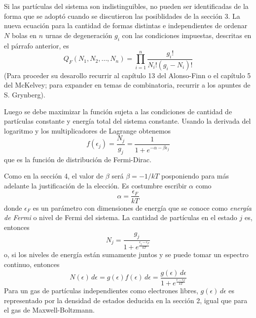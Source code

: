 \documentclass[12pt,a4paper]{article}
\def\e{{\epsilon}} %
\begin{document}
Si las partículas del sistema son indistinguibles, no pueden ser identificadas de la forma que se adoptó cuando se discutieron las posiblidades de la sección 3. La nueva ecuación para la cantidad de formas distintas e independientes de ordenar $N$ bolas en $n$ urnas de degeneración $g_{i}$ con las condiciones impuestas, descritas en el párrafo anterior, es
\[ Q_{F}(N_{1},N_{2}, \ldots, N_{n})=\prod _{i=1}^{n} \frac{g_{i}!}{N_{i}!(g_{i}-N_{i})!} \]
(Para proceder su desarollo recurrir al capítulo 13 del Alonso-Finn o el capítulo 5 del McKelvey; para expander en temas de combinatoria, recurrir a los apuntes de S. Grynberg).

Luego se debe maximizar la función sujeta a las condiciones de cantidad de partículas constante y energía total del sistema constante. Usando la derivada del logaritmo y los multiplicadores de Lagrange obtenemos
\[ f(\e_{j})=\frac{N_{j}}{g_{j}}=\frac{1}{1+e^{-\alpha-\beta \e_{j}}} \]
que es la función de distribución de Fermi-Dirac.

Como en la sección 4, el valor de $\beta$ será $\beta=-1/kT$ posponiendo para más adelante la justificación de la elección. Es costumbre escribir $\alpha$ como
\[ \alpha=\frac{\e_{F}}{kT} \]
donde $\e_{F}$ es un parámetro con dimensiones de energía que se conoce como \emph{energía de Fermi} o nivel de Fermi del sistema. La cantidad de partículas en el estado $j$ es, entonces
\[ N_{j}=\frac{g_{j}}{1+e^{\frac{\e_{j}-\e_{F}}{kT}}} \]
o, si los niveles de energía están sumamente juntos y se puede tomar un espectro continuo, entonces
\[ N(\e) \, d\e=g(\e)f(\e)\,d\e=\frac{g(\e) \, d\e}{1+e^{\frac{\e-\e_{F}}{kT}}} \]
Para un gas de partículas independientes como electrones libres, $g(\e)\,d\e$ es representado por la densidad de estados deducida en la sección 2, igual que para el gas de Maxwell-Boltzmann.
\end{document}
